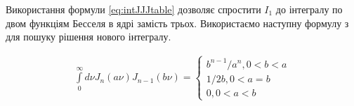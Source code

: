 %
%

Використання формули \eqref{eq:intJJJtable} дозволяє спростити $ I_1 $ до 
інтегралу по двом функціям Бесселя в ядрі замість трьох. Використаємо наступну 
формулу з \cite{imp:Golubovic2013} для пошуку рішення нового інтегралу. 

\begin{equation} \begin{aligned} \label{eq:intJJtable}
\int\limits_{0}^{\infty} d \nu
J_n \left( a \nu \right) J_{n-1} \left( b \nu \right) = \begin{cases} 
b^{n-1} / a^n , 0 < b < a \\
1 / 2 b , 0 < a = b \\
0 , 0 < a < b
\end{cases} 
\end{aligned} \end{equation}

